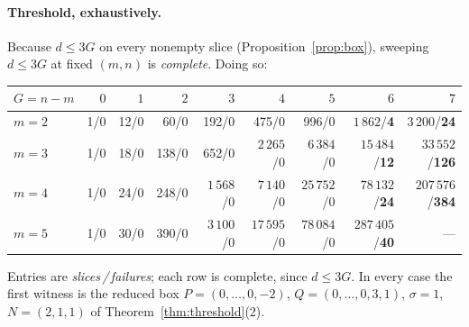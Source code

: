 \documentclass[11pt]{article}
\theoremstyle{definition}
\begin{document}
\paragraph{Threshold, exhaustively.} Because $d\le3G$ on every nonempty slice
(Proposition~\ref{prop:box}), sweeping $d\le3G$ at fixed $(m,n)$ is \emph{complete}.
Doing so:
\begin{center}
\small
\begin{tabular}{l|rrrrrrrr}
 $G=n-m$ & $0$ & $1$ & $2$ & $3$ & $4$ & $5$ & $6$ & $7$\\\hline
 $m=2$ & 1/0 & 12/0 & 60/0 & 192/0 & 475/0 & 996/0 & $1\,862$/\textbf{4} & $3\,200$/\textbf{24}\\
 $m=3$ & 1/0 & 18/0 & 138/0 & 652/0 & $2\,265$/0 & $6\,384$/0 & $15\,484$/\textbf{12} & $33\,552$/\textbf{126}\\
 $m=4$ & 1/0 & 24/0 & 248/0 & $1\,568$/0 & $7\,140$/0 & $25\,752$/0 & $78\,132$/\textbf{24} & $207\,576$/\textbf{384}\\
 $m=5$ & 1/0 & 30/0 & 390/0 & $3\,100$/0 & $17\,595$/0 & $78\,084$/0 & $287\,405$/\textbf{40} & ---\\
\end{tabular}
\normalsize
\end{center}
Entries are \emph{slices\,/\,failures}; each row is complete, since $d\le3G$.
In every case the first witness is the reduced box $P=(0,\dots,0,-2)$,
$Q=(0,\dots,0,3,1)$, $\sigma=1$, $N=(2,1,1)$ of Theorem~\ref{thm:threshold}(2).
\end{document}
